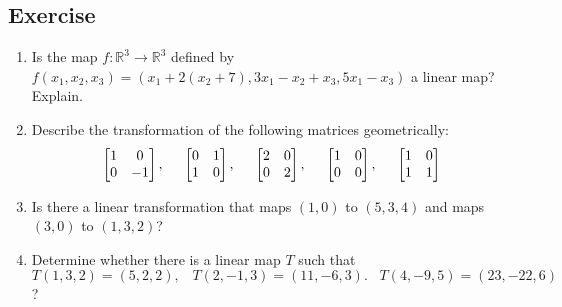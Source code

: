 \documentclass[math101_lecturenotes_ku.tex]{subfiles}
\begin{document}
\subsection{Exercise}
\begin{enumerate}

    \item Is the  map $f: \mathbb{R}^3 \to \mathbb{R}^3$ defined by $f(x_1,x_2,x_3)=(x_1+2(x_2+7),3x_1-x_2+x_3,5x_1-x_3)$ a linear map? Explain.

    \item Describe the transformation of the following matrices geometrically:
    $$\begin{bmatrix}
        1 & 0\\
        0 & -1
    \end{bmatrix}, \hspace{5mm} \begin{bmatrix}
        0 & 1 \\
        1 & 0
    \end{bmatrix}, \hspace{5mm} \begin{bmatrix}
        2 & 0 \\
        0 & 2
    \end{bmatrix}, \hspace{5mm} \begin{bmatrix}
        1 & 0 \\
        0 & 0
    \end{bmatrix}, \hspace{5mm} \begin{bmatrix}
        1 & 0 \\
        1 & 1
    \end{bmatrix}$$

    \item Is there a linear transformation that maps $(1,0)$ to $(5,3,4)$ and maps $(3,0)$ to $(1,3,2)$?

    \item Determine whether there is a linear map $T$ such that \\
    $\displaystyle T(1,3,2)=(5,2,2), \;\;\; T(2,-1,3)=(11,-6,3). \;\;\; T(4,-9,5)=(23,-22,6)$ ?
  \end{enumerate}
\end{document}
